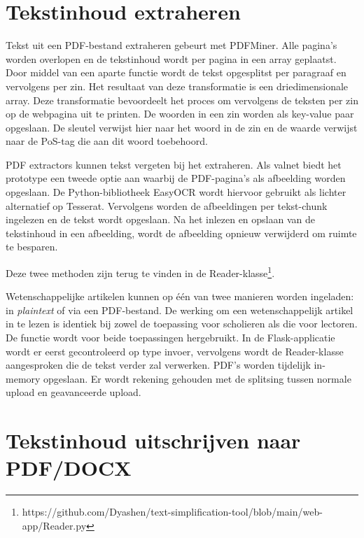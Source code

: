 \section{Tekstinhoud extraheren}

Tekst uit een PDF-bestand extraheren gebeurt met PDFMiner. Alle pagina's worden overlopen en de tekstinhoud wordt per pagina in een array geplaatst. Door middel van een aparte functie wordt de tekst opgesplitst per paragraaf en vervolgens per zin. Het resultaat van deze transformatie is een driedimensionale array. Deze transformatie bevoordeelt het proces om vervolgens de teksten per zin op de webpagina uit te printen. De woorden in een zin worden als key-value paar opgeslaan. De sleutel verwijst hier naar het woord in de zin en de waarde verwijst naar de PoS-tag die aan dit woord toebehoord. 

PDF extractors kunnen tekst vergeten bij het extraheren. Als valnet biedt het prototype een tweede optie aan waarbij de PDF-pagina's als afbeelding worden opgeslaan. De Python-bibliotheek EasyOCR wordt hiervoor gebruikt als lichter alternatief op  Tesserat. Vervolgens worden de afbeeldingen per tekst-chunk ingelezen en de tekst wordt opgeslaan. Na het inlezen en opslaan van de tekstinhoud in een afbeelding, wordt de afbeelding opnieuw verwijderd om ruimte te besparen.

Deze twee methoden zijn terug te vinden in de Reader-klasse\footnote{https://github.com/Dyashen/text-simplification-tool/blob/main/web-app/Reader.py}.


Wetenschappelijke artikelen kunnen op één van twee manieren worden ingeladen: in \textit{plaintext} of via een PDF-bestand. De werking om een wetenschappelijk artikel in te lezen is identiek bij zowel de toepassing voor scholieren als die voor lectoren. De functie wordt voor beide toepassingen hergebruikt. In de Flask-applicatie wordt er eerst gecontroleerd op type invoer, vervolgens wordt de Reader-klasse aangesproken die de tekst verder zal verwerken. PDF's worden tijdelijk in-memory opgeslaan. Er wordt rekening gehouden met de splitsing tussen normale upload en geavanceerde upload.

\section{Tekstinhoud uitschrijven naar PDF/DOCX}


